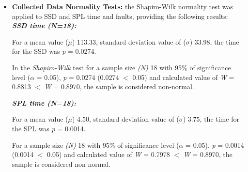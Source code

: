\begin{itemize}

\item \textbf{Collected Data Normality Tests:} the Shapiro-Wilk \cite{shaphirowilk65} normality test was applied to SSD and SPL time and faults, providing the following results:\\

\textbf{\textit{SSD time (\textit{N}=18):}}

For a mean value ($\mu$) 113.33, standard deviation value of ($\sigma$) 33.98, the time for the SSD was \textit{p} = 0.0274.

In the \textit{Shapiro-Wilk} test for a sample size \textit{(N)} 18 with 95\% of significance level ($\alpha$ = 0.05), \textit{p} = 0.0274 (0.0274 $<$ 0.05) and calculated value of \textit{W} = 0.8813 $<$ \textit{W} = 0.8970, the sample is considered non-normal.

%
%




\textbf{\textit{SPL time (\textit{N}=18):}}

For a mean value ($\mu$) 4.50, standard deviation value of ($\sigma$) 3.75, the time for the SPL was \textit{p} = 0.0014.

For a sample size \textit{(N)} 18 with 95\% of significance level ($\alpha$ = 0.05), \textit{p} = 0.0014 (0.0014 $<$ 0.05) and calculated value of \textit{W} = 0.7978 $<$ \textit{W} = 0.8970, the sample is considered non-normal.

%
%






\end{itemize}
